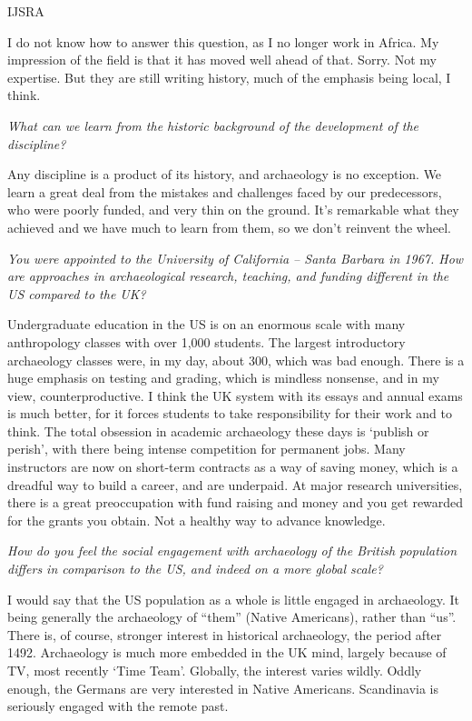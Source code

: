 \begin{labeling}{IJSRA}
\item[BMF] I do not know how to answer this question, as I no longer work in Africa. My impression of the field is that it has moved well ahead of that. Sorry. Not my expertise. But they are still writing history, much of the emphasis being local, I think.

\item[IJSRA] \emph{What can we learn from the historic background of the development of the discipline?}

\item[BMF] Any discipline is a product of its history, and archaeology is no exception. We learn a great deal from the mistakes and challenges faced by our predecessors, who were poorly funded, and very thin on the ground. It’s remarkable what they achieved and we have much to learn from them, so we don’t reinvent the wheel.

\item[IJSRA] \emph{You were appointed to the University of California – Santa Barbara in 1967. How are approaches in archaeological research, teaching, and funding different in the US compared to the UK?}

\item[BMF] Undergraduate education in the US is on an enormous scale with many anthropology classes with over 1,000 students. The largest introductory archaeology classes were, in my day, about 300, which was bad enough. There is a huge emphasis on testing and grading, which is mindless nonsense, and in my view, counterproductive. I think the UK system with its essays and annual exams is much better, for it forces students to take responsibility for their work and to think. The total obsession in academic archaeology these days is ‘publish or perish’, with there being intense competition for permanent jobs. Many instructors are now on short-term contracts as a way of saving money, which is a dreadful way to build a career, and are underpaid. At major research universities, there is a great preoccupation with fund raising and money and you get rewarded for the grants you obtain. Not a healthy way to advance knowledge.

\item[IJSRA] \emph{How do you feel the social engagement with archaeology of the British population differs in comparison to the US, and indeed on a more global scale?}
	
\item[BMF] I would say that the US population as a whole is little engaged in archaeology. It being generally the archaeology of “them” (Native Americans), rather than “us”. There is, of course, stronger interest in historical archaeology, the period after 1492. Archaeology is much more embedded in the UK mind, largely because of TV, most recently ‘Time Team’. Globally, the interest varies wildly. Oddly enough, the Germans are very interested in Native Americans. Scandinavia is seriously engaged with the remote past.
	

\end{labeling}
